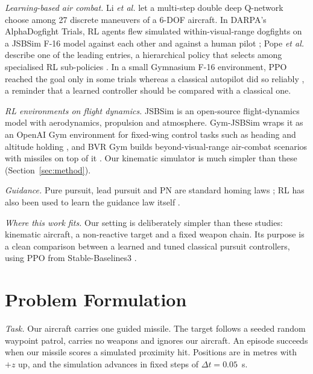 \documentclass[conference]{IEEEtran}
\begin{document}
\emph{Learning-based air combat.} Li \emph{et al.} \cite{li2022msddqn} let a multi-step double deep Q-network choose among 27 discrete maneuvers of a 6-DOF aircraft. In DARPA's AlphaDogfight Trials, RL agents flew simulated within-visual-range dogfights on a JSBSim F-16 model against each other and against a human pilot \cite{demay2022adt}; Pope \emph{et al.} describe one of the leading entries, a hierarchical policy that selects among specialised RL sub-policies \cite{pope2021hierarchical,pope2023adt}. In a small Gymnasium F-16 environment, PPO reached the goal only in some trials whereas a classical autopilot did so reliably \cite{search2025tunnel}, a reminder that a learned controller should be compared with a classical one.

\emph{RL environments on flight dynamics.} JSBSim \cite{berndt2004jsbsim} is an open-source flight-dynamics model with aerodynamics, propulsion and atmosphere. Gym-JSBSim wraps it as an OpenAI Gym environment for fixed-wing control tasks such as heading and altitude holding \cite{rennie2018gymjsbsim}, and BVR Gym builds beyond-visual-range air-combat scenarios with missiles on top of it \cite{scukins2024bvrgym}. Our kinematic simulator is much simpler than these (Section~\ref{sec:method}).

\emph{Guidance.} Pure pursuit, lead pursuit and PN are standard homing laws \cite{shneydor1998pursuit,zarchan2012guidance}; RL has also been used to learn the guidance law itself \cite{gaudet2020intercept}.

\emph{Where this work fits.} Our setting is deliberately simpler than these studies: kinematic aircraft, a non-reactive target and a fixed weapon chain. Its purpose is a clean comparison between a learned and tuned classical pursuit controllers, using PPO from Stable-Baselines3 \cite{raffin2021sb3}.

\section{Problem Formulation}\label{sec:problem}
\emph{Task.} Our aircraft carries one guided missile. The target follows a seeded random waypoint patrol, carries no weapons and ignores our aircraft. An episode succeeds when our missile scores a simulated proximity hit. Positions are in metres with $+z$ up, and the simulation advances in fixed steps of $\Delta t=0.05$~s.
\end{document}
